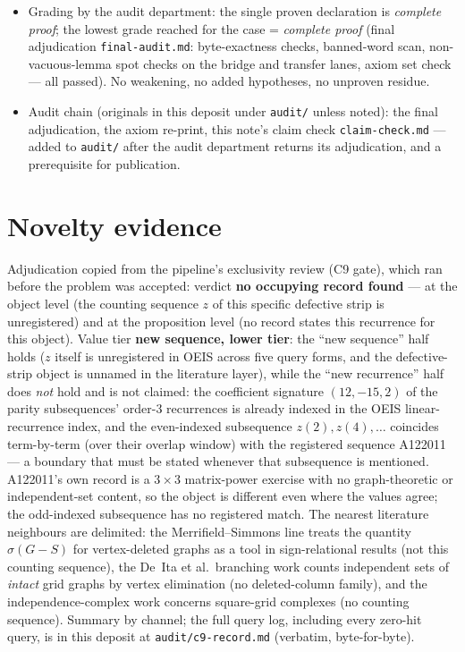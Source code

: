 \documentclass[11pt]{article}
\begin{document}
\begin{itemize}
docstring, which \emph{bans} it; the axiom output is the authoritative
criterion.
\item Grading by the audit department: the single proven declaration is
\emph{complete proof}; the lowest grade reached for the case = \emph{complete
proof} (final adjudication \texttt{final-audit.md}: byte-exactness checks,
banned-word scan, non-vacuous-lemma spot checks on the bridge and transfer
lanes, axiom set check --- all passed). No weakening, no added hypotheses,
no unproven residue.
\item Audit chain (originals in this deposit under \texttt{audit/} unless
noted): the final adjudication, the axiom re-print, this note's claim check
\texttt{claim-check.md} --- added to \texttt{audit/} after the audit
department returns its adjudication, and a prerequisite for publication.
\end{itemize}

\section{Novelty evidence}\label{sec:novelty}

Adjudication copied from the pipeline's exclusivity review (C9 gate), which
ran before the problem was accepted: verdict \textbf{no occupying record
found} --- at the object level (the counting sequence $z$ of this specific
defective strip is unregistered) and at the proposition level (no record
states this recurrence for this object). Value tier \textbf{new sequence,
lower tier}: the ``new sequence'' half holds ($z$ itself is unregistered in
OEIS across five query forms, and the defective-strip object is unnamed in
the literature layer), while the ``new recurrence'' half does \emph{not}
hold and is not claimed: the coefficient signature $(12,-15,2)$ of the
parity subsequences' order-3 recurrences is already indexed in the OEIS
linear-recurrence index, and the even-indexed subsequence
$z(2), z(4), \dots$ coincides term-by-term (over their overlap window) with
the registered sequence A122011 \cite{a122011} --- a boundary that must be
stated whenever that subsequence is mentioned. A122011's own record is a
$3\times3$ matrix-power exercise with no graph-theoretic or
independent-set content, so the object is different even where the values
agree; the odd-indexed subsequence has no registered match. The nearest
literature neighbours are delimited: the Merrifield--Simmons line
\cite{trinks2010} treats the quantity $\sigma(G - S)$ for vertex-deleted
graphs as a tool in sign-relational results (not this counting sequence),
the De~Ita et al.\ branching work \cite{deita2024} counts independent sets
of \emph{intact} grid graphs by vertex elimination (no deleted-column
family), and the independence-complex work \cite{jonsson2007} concerns
square-grid complexes (no counting sequence). Summary by channel; the full
query log, including every zero-hit query, is in this deposit at
\texttt{audit/c9-record.md} (verbatim, byte-for-byte).
\end{document}
